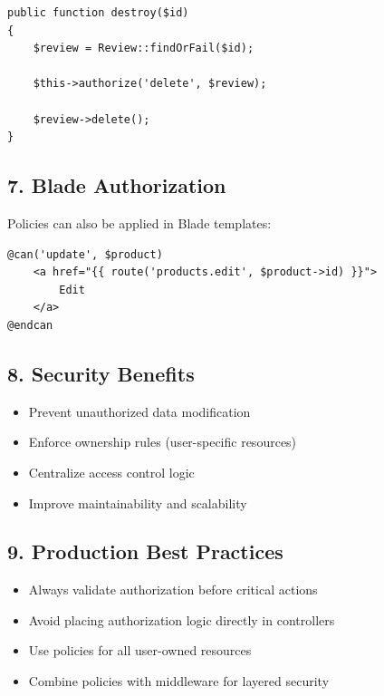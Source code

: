 \documentclass[12pt,a4paper]{article}
\begin{document}
\begin{verbatim}
public function destroy($id)
{
    $review = Review::findOrFail($id);

    $this->authorize('delete', $review);

    $review->delete();
}
\end{verbatim}

\subsection{7. Blade Authorization}

Policies can also be applied in Blade templates:

\begin{verbatim}
@can('update', $product)
    <a href="{{ route('products.edit', $product->id) }}">
        Edit
    </a>
@endcan
\end{verbatim}

\subsection{8. Security Benefits}

\begin{itemize}[noitemsep]
    \item Prevent unauthorized data modification
    \item Enforce ownership rules (user-specific resources)
    \item Centralize access control logic
    \item Improve maintainability and scalability
\end{itemize}

\subsection{9. Production Best Practices}

\begin{itemize}[noitemsep]
    \item Always validate authorization before critical actions
    \item Avoid placing authorization logic directly in controllers
    \item Use policies for all user-owned resources
    \item Combine policies with middleware for layered security
\end{itemize}
\end{document}
